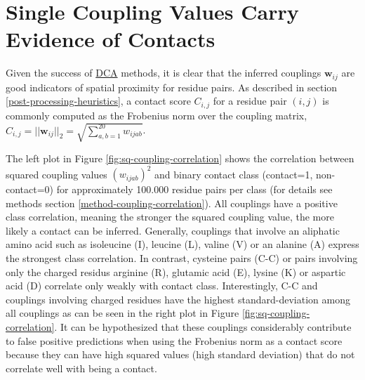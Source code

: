 \documentclass[12pt,a4paper,twoside]{book}
\newcommand{\wij}{\mathbf{w}_{ij}}
\newcommand{\wijab}{w_{ijab}}
\theoremstyle{definition}
\theoremstyle{definition}
\theoremstyle{remark}
\begin{document}
\section{Single Coupling Values Carry Evidence of
Contacts}\label{correlation-between-couplings-and-class}

Given the success of \protect\hyperlink{abbrev}{DCA} methods, it is
clear that the inferred couplings \(\wij\) are good indicators of
spatial proximity for residue pairs. As described in section
\ref{post-processing-heuristics}, a contact score \(C_{i,j}\) for a
residue pair \((i,j)\) is commonly computed as the Frobenius norm over
the coupling matrix,
\(C_{i,j}=||\wij||_2 = \sqrt{\sum_{a,b=1}^{20} \wijab}\).

The left plot in Figure \ref{fig:sq-coupling-correlation} shows the
correlation between squared coupling values \((\wijab)^2\) and binary
contact class (contact=1, non-contact=0) for approximately 100.000
residue pairs per class (for details see methods section
\ref{method-coupling-correlation}). All couplings have a positive class
correlation, meaning the stronger the squared coupling value, the more
likely a contact can be inferred. Generally, couplings that involve an
aliphatic amino acid such as isoleucine (I), leucine (L), valine (V) or
an alanine (A) express the strongest class correlation. In contrast,
cysteine pairs (C-C) or pairs involving only the charged residus
arginine (R), glutamic acid (E), lysine (K) or aspartic acid (D)
correlate only weakly with contact class. Interestingly, C-C and
couplings involving charged residues have the highest standard-deviation
among all couplings as can be seen in the right plot in Figure
\ref{fig:sq-coupling-correlation}. It can be hypothesized that these
couplings considerably contribute to false positive predictions when
using the Frobenius norm as a contact score because they can have high
squared values (high standard deviation) that do not correlate well with
being a contact.
\end{document}
